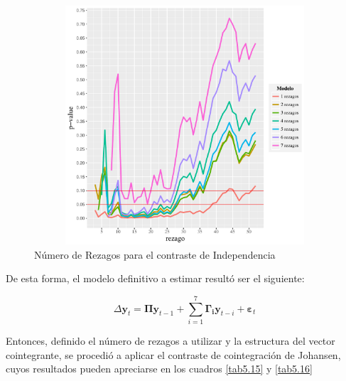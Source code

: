 \documentclass[12pt, twoside]{book}\usepackage[]{graphicx}\usepackage[]{color}
\newenvironment{knitrout}{}{} %
\numberwithin{equation}{section}
\numberwithin{theorem}{section}
\numberwithin{teorema}{section}
\numberwithin{defi}{section}
\numberwithin{prop}{section}
\numberwithin{defi}{section}
\theoremstyle{plain}
\begin{document}
\begin{knitrout}
\color{fgcolor}\begin{figure}[!htpb]

{\centering \includegraphics[width=5in,height=3.5in]{figure/unnamed-chunk-24-1} 

}

\caption{Número de Rezagos para el contraste de Independencia\label{fig5.6}}\label{fig:unnamed-chunk-24}
\end{figure}


\end{knitrout}

De esta forma, el modelo definitivo a estimar resultó ser el siguiente: 

\begin{equation}
\Delta \mathbf{y}_{t} = \boldsymbol{\Pi}\mathbf{y}_{t-1}+\sum_{i=1}^{7}\boldsymbol{\Gamma_{i}}\mathbf{y}_{t-i}+\boldsymbol{\varepsilon}_{t}
\end{equation}

Entonces, definido el número de rezagos a utilizar y la estructura del vector cointegrante, se procedió a aplicar el contraste de cointegración de Johansen, cuyos resultados pueden apreciarse en los cuadros \ref{tab5.15} y \ref{tab5.16}
\end{document}
